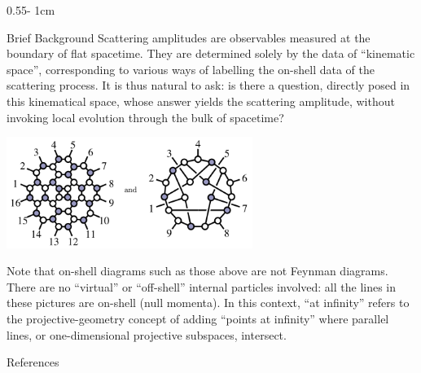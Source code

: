 \documentclass{../psuposter}
\begin{document}
\begin{frame}
\begin{columns}[onlytextwidth]
\begin{column}{0.55\textwidth - 1cm}
    \begin{block}{Brief Background}
        Scattering amplitudes are observables measured at the boundary of flat spacetime. They are determined solely by the data of “kinematic space”, corresponding to various ways of labelling the on-shell data of the scattering process. It is thus natural to ask: is there a question, directly posed in this kinematical space, whose answer yields the scattering amplitude, without invoking local evolution through the bulk of spacetime? \cite{arkani-hamedCausalDiamondsCluster2020}
        \begin{center}
	    	\includegraphics[width=0.6\textwidth]{images/on-shell}    		
    	\end{center}
		Note that on-shell diagrams such as those above are not Feynman diagrams. There are no “virtual” or “off-shell” internal particles involved: all the lines in these pictures are on-shell (null momenta).  
		In this context, ``at infinity'' refers to the projective-geometry concept of adding ``points at infinity'' where parallel lines, or one-dimensional projective subspaces, intersect.
        \cite{naberTopologyGeometryGauge2011b}
    \end{block}

    \begin{block}{References}
        
		
    \end{block}


\end{column}
\end{columns}
\end{frame}
\end{document}
